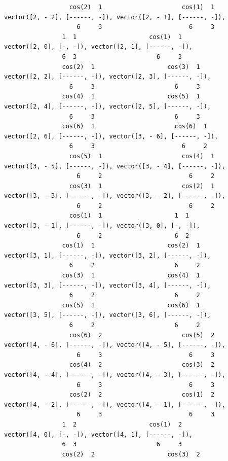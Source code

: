 \documentclass[12pt,letterpaper]{article}
\begin{document}
\begin{verbatim}
                  cos(2)  1                      cos(1)  1
vector([2, - 2], [------, -]), vector([2, - 1], [------, -]), 
                    6     3                        6     3
                1  1                    cos(1)  1
vector([2, 0], [-, -]), vector([2, 1], [------, -]), 
                6  3                      6     3
                cos(2)  1                    cos(3)  1
vector([2, 2], [------, -]), vector([2, 3], [------, -]), 
                  6     3                      6     3
                cos(4)  1                    cos(5)  1
vector([2, 4], [------, -]), vector([2, 5], [------, -]), 
                  6     3                      6     3
                cos(6)  1                      cos(6)  1
vector([2, 6], [------, -]), vector([3, - 6], [------, -]), 
                  6     3                        6     2
                  cos(5)  1                      cos(4)  1
vector([3, - 5], [------, -]), vector([3, - 4], [------, -]), 
                    6     2                        6     2
                  cos(3)  1                      cos(2)  1
vector([3, - 3], [------, -]), vector([3, - 2], [------, -]), 
                    6     2                        6     2
                  cos(1)  1                    1  1
vector([3, - 1], [------, -]), vector([3, 0], [-, -]), 
                    6     2                    6  2
                cos(1)  1                    cos(2)  1
vector([3, 1], [------, -]), vector([3, 2], [------, -]), 
                  6     2                      6     2
                cos(3)  1                    cos(4)  1
vector([3, 3], [------, -]), vector([3, 4], [------, -]), 
                  6     2                      6     2
                cos(5)  1                    cos(6)  1
vector([3, 5], [------, -]), vector([3, 6], [------, -]), 
                  6     2                      6     2
                  cos(6)  2                      cos(5)  2
vector([4, - 6], [------, -]), vector([4, - 5], [------, -]), 
                    6     3                        6     3
                  cos(4)  2                      cos(3)  2
vector([4, - 4], [------, -]), vector([4, - 3], [------, -]), 
                    6     3                        6     3
                  cos(2)  2                      cos(1)  2
vector([4, - 2], [------, -]), vector([4, - 1], [------, -]), 
                    6     3                        6     3
                1  2                    cos(1)  2
vector([4, 0], [-, -]), vector([4, 1], [------, -]), 
                6  3                      6     3
                cos(2)  2                    cos(3)  2

\end{verbatim}
\end{document}
